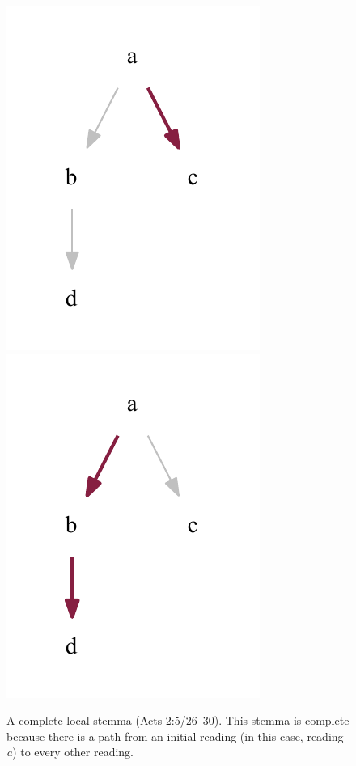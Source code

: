 \documentclass[a4paper, 12pt]{article}
\begin{document}
\begin{figure}[h!]
		\includegraphics[scale=0.6666]{../graphics/B05K2V5U26-30-local-stemma-path-2.pdf}
		\includegraphics[scale=0.6666]{../graphics/B05K2V5U26-30-local-stemma-path-3.pdf}
		\caption{A complete local stemma (Acts 2:5/26–30). This stemma is complete because there is a path from an initial reading (in this case, reading \emph{a}) to every other reading.}
		\label{fig:local-stemma-complete}
	\end{figure}
	
	\newpage
	
\end{document}
